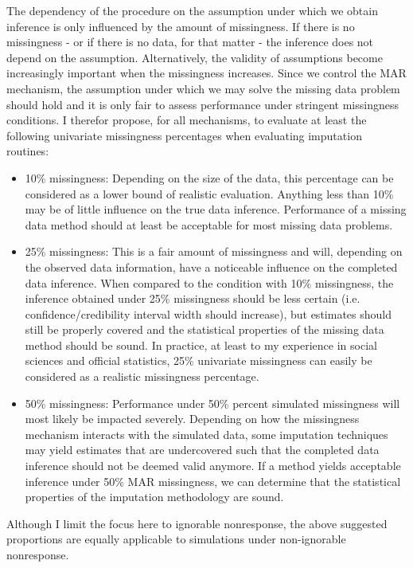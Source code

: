 \documentclass[12pt, a4paper]{article}
\begin{document}
The dependency of the procedure on the assumption under which we obtain inference is only influenced by the amount of missingness. If there is no missingness - or if there is no data, for that matter - the inference does not depend on the assumption. Alternatively, the validity of assumptions become increasingly important when the missingness increases. Since we control the MAR mechanism, the assumption under which we may solve the missing data problem should hold and it is only fair to assess performance under stringent missingness conditions. I therefor propose, for all mechanisms, to evaluate at least the following univariate missingness percentages when evaluating imputation routines:

\begin{itemize}
  \item 10\% missingness: Depending on the size of the data, this percentage can be considered as a lower bound of realistic evaluation. Anything less than 10\% may be of little influence on the true data inference. Performance of a missing data method should at least be acceptable for most missing data problems. 
  \item 25\% missingness: This is a fair amount of missingness and will, depending on the observed data information, have a noticeable influence on the completed data inference. When compared to the condition with 10\% missingness, the inference obtained under 25\% missingness should be less certain (i.e. confidence/credibility interval width should increase), but estimates should still be properly covered and the statistical properties of the missing data method should be sound. In practice, at least to my experience in social sciences and official statistics, 25\% univariate missingness can easily be considered as a realistic missingness percentage. 
  \item 50\% missingness: Performance under 50\% percent simulated missingness will most likely be impacted severely. Depending on how the missingness mechanism interacts with the simulated data, some imputation techniques may yield estimates that are undercovered such that the completed data inference should not be deemed valid anymore. If a method yields acceptable inference under 50\% MAR missingness, we can determine that the statistical properties of the imputation methodology are sound. 
\end{itemize}
Although I limit the focus here to ignorable nonresponse, the above suggested proportions are equally applicable to simulations under non-ignorable nonresponse.
\end{document}
